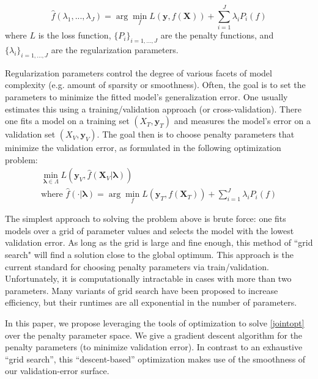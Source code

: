 \documentclass[10pt,letterpaper]{article}
\begin{document}
\begin{equation} \label {eq:basic}
\hat f(\lambda_1, ..., \lambda_J) = \arg \min_f L(\boldsymbol{y}, f (\boldsymbol{X})) + \sum\limits_{i=1}^J \lambda_i P_i(f)
\end{equation}
where $L$ is the loss function, $\{P_i\}_{i=1, ..., J}$ are the penalty functions, and $\{\lambda_i\}_{i=1, ..., J}$ are the regularization parameters.

Regularization parameters control the degree of various facets of model complexity (e.g. amount of sparsity or smoothness). Often, the goal is to set the parameters to minimize the fitted model's generalization error. One usually estimates this using a training/validation approach (or cross-validation). There one fits a model on a training set $(X_T, \boldsymbol y_T)$ and measures the model's error on a validation set $(X_V, \boldsymbol y_V)$. The goal then is to choose penalty parameters that minimize the validation error, as formulated in the following optimization problem:
\begin{equation}
\begin{array}{c}
\min_{\boldsymbol{\lambda} \in \Lambda} L(\boldsymbol{y}_V, \hat f (\boldsymbol{X}_V | \boldsymbol{\lambda})) \\
\text{where } \hat f(\cdot | \boldsymbol{\lambda}) = \arg \min_f L(\boldsymbol{y}_T, f (\boldsymbol{X}_T)) + \sum\limits_{i=1}^J \lambda_i P_i(f)
\end{array}
\label{jointopt}
\end{equation}

The simplest approach to solving the problem above is brute force: one fits models over a grid of parameter values and selects the model with the lowest validation error. As long as the grid is large and fine enough, this method of ``grid search" will find a solution close to the global optimum. This approach is the current standard for choosing penalty parameters via train/validation. Unfortunately, it is computationally intractable in cases with more than two parameters. Many variants of grid search have been proposed to increase efficiency, but their runtimes are all exponential in the number of parameters.

In this paper, we propose leveraging the tools of optimization to solve \eqref{jointopt} over the penalty parameter space. We give a gradient descent algorithm for the penalty parameters (to minimize validation error). In contrast to an exhaustive ``grid search'', this ``descent-based'' optimization makes use of the smoothness of our validation-error surface. 
\end{document}
